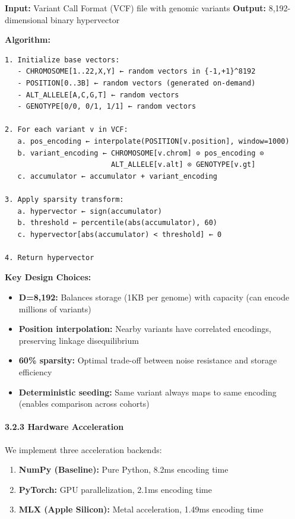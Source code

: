 \documentclass[
  11pt,
]{article}
\providecommand{\tightlist}{%
  \setlength{\itemsep}{0pt}\setlength{\parskip}{0pt}}
\begin{document}
\textbf{Input:} Variant Call Format (VCF) file with genomic variants
\textbf{Output:} 8,192-dimensional binary hypervector

\textbf{Algorithm:}

\begin{verbatim}
1. Initialize base vectors:
   - CHROMOSOME[1..22,X,Y] ← random vectors in {-1,+1}^8192
   - POSITION[0..3B] ← random vectors (generated on-demand)
   - ALT_ALLELE[A,C,G,T] ← random vectors
   - GENOTYPE[0/0, 0/1, 1/1] ← random vectors

2. For each variant v in VCF:
   a. pos_encoding ← interpolate(POSITION[v.position], window=1000)
   b. variant_encoding ← CHROMOSOME[v.chrom] ⊙ pos_encoding ⊙
                         ALT_ALLELE[v.alt] ⊙ GENOTYPE[v.gt]
   c. accumulator ← accumulator + variant_encoding

3. Apply sparsity transform:
   a. hypervector ← sign(accumulator)
   b. threshold ← percentile(abs(accumulator), 60)
   c. hypervector[abs(accumulator) < threshold] ← 0

4. Return hypervector
\end{verbatim}

\textbf{Key Design Choices:}

\begin{itemize}
\tightlist
\item
  \textbf{D=8,192:} Balances storage (1KB per genome) with capacity (can
  encode millions of variants)
\item
  \textbf{Position interpolation:} Nearby variants have correlated
  encodings, preserving linkage disequilibrium
\item
  \textbf{60\% sparsity:} Optimal trade-off between noise resistance and
  storage efficiency
\item
  \textbf{Deterministic seeding:} Same variant always maps to same
  encoding (enables comparison across cohorts)
\end{itemize}

\paragraph{3.2.3 Hardware Acceleration}\label{hardware-acceleration}

We implement three acceleration backends:

\begin{enumerate}
\def\labelenumi{\arabic{enumi}.}
\tightlist
\item
  \textbf{NumPy (Baseline):} Pure Python, 8.2ms encoding time
\item
  \textbf{PyTorch:} GPU parallelization, 2.1ms encoding time
\item
  \textbf{MLX (Apple Silicon):} Metal acceleration, 1.49ms encoding time
\end{enumerate}
\end{document}
